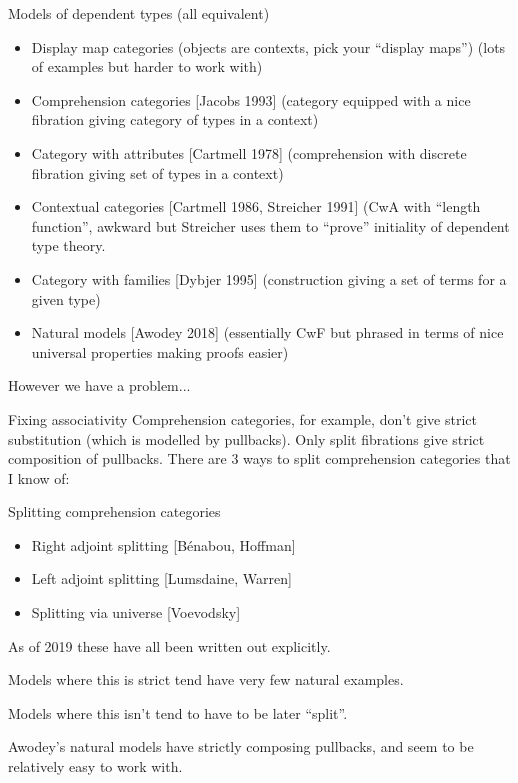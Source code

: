 \documentclass[usenames,dvipsnames]{beamer}
\begin{document}
    \begin{frame}{Models of dependent types (all equivalent)}
        \begin{itemize}
            \item Display map categories (objects are contexts, pick your ``display maps'') (lots of examples but harder to work with)
            \item Comprehension categories [Jacobs 1993] (category equipped with a nice fibration giving category of types in a context)
            \item Category with attributes [Cartmell 1978] (comprehension with discrete fibration giving set of types in a context)
            \item Contextual categories [Cartmell 1986, Streicher 1991] (CwA with ``length function'', awkward but Streicher uses them to ``prove'' initiality of dependent type theory.
            \item Category with families [Dybjer 1995] (construction giving a set of terms for a given type)
            \item Natural models [Awodey 2018] (essentially CwF but phrased in terms of nice universal properties making proofs easier)
        \end{itemize}
        
        However we have a problem...
    \end{frame}
    
    \begin{frame}{Fixing associativity}  
        Comprehension categories, for example, don't give strict substitution (which is modelled by pullbacks). Only split fibrations give strict composition of pullbacks. There are 3 ways to split comprehension categories that I know of:
        \begin{block}{Splitting comprehension categories}
            \begin{itemize}
                \item Right adjoint splitting [B\'enabou, Hoffman]
                \item Left adjoint splitting [Lumsdaine, Warren]
                \item Splitting via universe [Voevodsky]
            \end{itemize}
            As of 2019 these have all been written out explicitly.
        \end{block}
        
        Models where this is strict tend have very few natural examples.
        
        Models where this isn't tend to have to be later ``split''.
        
        
        Awodey's natural models have strictly composing pullbacks, and seem to be relatively easy to work with.
        
    \end{frame}
    
\end{document}

